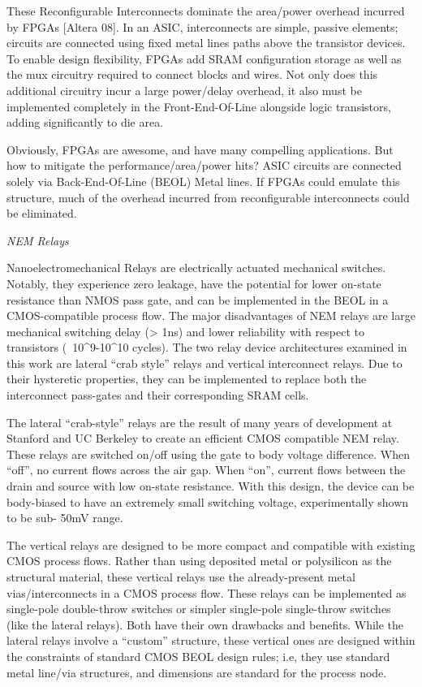 \documentclass[twoside,twocolumn]{article}
\begin{document}
These Reconfigurable Interconnects dominate the area/power overhead incurred by FPGAs [Altera 08]. In an ASIC, interconnects are simple, passive elements; circuits are connected using fixed metal lines paths above the transistor devices. To enable design flexibility, FPGAs add SRAM configuration storage as well as the mux circuitry required to connect blocks and wires. Not only does this additional circuitry incur a large power/delay overhead, it also must be implemented completely in the Front-End-Of-Line alongside logic transistors, adding significantly to die area.

Obviously, FPGAs are awesome, and have many compelling applications. But how to mitigate the performance/area/power hits? ASIC circuits are connected solely via Back-End-Of-Line (BEOL) Metal lines. If FPGAs could emulate this structure, much of the overhead incurred from reconfigurable interconnects could be eliminated.


\textit{NEM Relays}

Nanoelectromechanical Relays are electrically actuated mechanical switches. Notably, they experience zero leakage, have the potential for lower on-state resistance than NMOS pass gate, and can be implemented in the BEOL in a CMOS-compatible process flow. The major disadvantages of NEM relays are large mechanical switching delay (> 1ns) and lower reliability with respect to transistors (~10^9-10^10 cycles). The two relay device architectures examined in this work are lateral “crab style” relays and vertical interconnect relays. Due to their hysteretic properties, they can be implemented to replace both the interconnect pass-gates and their corresponding SRAM cells.

The lateral “crab-style” relays are the result of many years of development at Stanford and UC Berkeley to create an efficient CMOS compatible NEM relay. These relays are switched on/off using the gate to body voltage difference. When “off”, no current flows across the air gap. When “on”, current flows between the drain and source with low on-state resistance. With this design, the device can be body-biased to have an extremely small switching voltage, experimentally shown to be sub- 50mV range.

The vertical relays are designed to be more compact and compatible with existing CMOS process flows. Rather than using deposited metal or polysilicon as the structural material, these vertical relays use the already-present metal vias/interconnects in a CMOS process flow. These relays can be implemented as single-pole double-throw switches or simpler single-pole single-throw switches (like the lateral relays). Both have their own drawbacks and benefits. While the lateral relays involve a “custom” structure, these vertical ones are designed within the constraints of standard CMOS BEOL design rules; i.e, they use standard metal line/via structures, and dimensions are standard for the process node.
\end{document}
